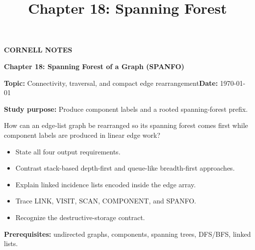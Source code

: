 \documentclass[10pt,letterpaper]{article}
\title{Chapter 18: Spanning Forest}
\author{}
\date{}
\begin{document}
\maketitle
\begin{tcolorbox}[colback=Paper,colframe=Ink]{\small\bfseries\color{Teal}CORNELL NOTES}\par{\LARGE\bfseries Chapter 18: Spanning Forest of a Graph (SPANFO)}\par\medskip\textbf{Topic:} Connectivity, traversal, and compact edge rearrangement\hfill\textbf{Date:} \today\par\textbf{Study purpose:} Produce component labels and a rooted spanning-forest prefix.\end{tcolorbox}
\begin{tcolorbox}[colback=Teal!5,colframe=Teal,title=Essential question]How can an edge-list graph be rearranged so its spanning forest comes first while component labels are produced in linear edge work?\end{tcolorbox}
\begin{tcolorbox}[colback=white,colframe=Mist,title=Learning objectives]\begin{itemize}\item State all four output requirements.\item Contrast stack-based depth-first and queue-like breadth-first approaches.\item Explain linked incidence lists encoded inside the edge array.\item Trace LINK, VISIT, SCAN, COMPONENT, and SPANFO.\item Recognize the destructive-storage contract.\end{itemize}\textbf{Prerequisites:} undirected graphs, components, spanning trees, DFS/BFS, linked lists.\end{tcolorbox}
\end{document}
